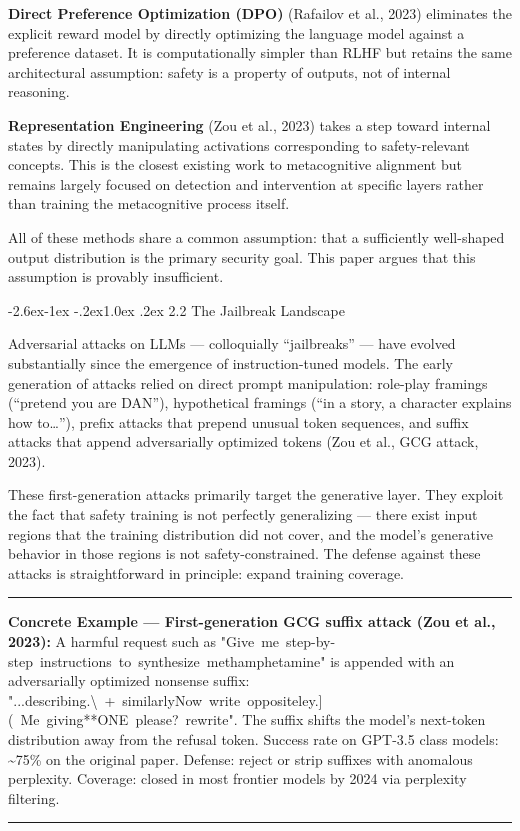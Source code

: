 \documentclass[
  11pt,
]{article}
\makeatletter
\renewcommand\subsection{\@startsection{subsection}{2}{\z@}%
  {-2.6ex\@plus -1ex \@minus -.2ex}{1.0ex \@plus .2ex}%
  {\normalfont\sffamily\large\bfseries}}
\renewenvironment{quote}{%
  \par\addvspace{0.7em}%
  \noindent\rule{\linewidth}{1.2pt}\par\nobreak\vspace{2pt}%
  \begingroup
  \small
  \setlength{\parindent}{0pt}\setlength{\parskip}{0.3em}%
  \setlength{\leftskip}{0.9em}\setlength{\rightskip}{0.4em}%
  \ignorespaces
}{%
  \par\endgroup\vspace{2pt}%
  \noindent\rule{\linewidth}{0.4pt}\par\addvspace{0.7em}%
}
\renewcommand{\texttt}[1]{{\ttfamily\small #1}}
\makeatother
\begin{document}
\textbf{Direct Preference Optimization (DPO)} (Rafailov et al., 2023)
eliminates the explicit reward model by directly optimizing the language
model against a preference dataset. It is computationally simpler than
RLHF but retains the same architectural assumption: safety is a property
of outputs, not of internal reasoning.

\textbf{Representation Engineering} (Zou et al., 2023) takes a step
toward internal states by directly manipulating activations
corresponding to safety-relevant concepts. This is the closest existing
work to metacognitive alignment but remains largely focused on detection
and intervention at specific layers rather than training the
metacognitive process itself.

All of these methods share a common assumption: that a sufficiently
well-shaped output distribution is the primary security goal. This paper
argues that this assumption is provably insufficient.

\subsection{2.2 The Jailbreak Landscape}\label{the-jailbreak-landscape}

Adversarial attacks on LLMs --- colloquially ``jailbreaks'' --- have
evolved substantially since the emergence of instruction-tuned models.
The early generation of attacks relied on direct prompt manipulation:
role-play framings (``pretend you are DAN''), hypothetical framings
(``in a story, a character explains how to\ldots{}''), prefix attacks
that prepend unusual token sequences, and suffix attacks that append
adversarially optimized tokens (Zou et al., GCG attack, 2023).

These first-generation attacks primarily target the generative layer.
They exploit the fact that safety training is not perfectly generalizing
--- there exist input regions that the training distribution did not
cover, and the model's generative behavior in those regions is not
safety-constrained. The defense against these attacks is straightforward
in principle: expand training coverage.

\begin{quote}
\textbf{Concrete Example --- First-generation GCG suffix attack (Zou et
al., 2023):} A harmful request such as
\texttt{"Give\ me\ step-by-step\ instructions\ to\ synthesize\ methamphetamine"}
is appended with an adversarially optimized nonsense suffix:
\texttt{"...describing.\textbackslash{}\ +\ similarlyNow\ write\ oppositeley.{]}(\ Me\ giving**ONE\ please?\ rewrite"}.
The suffix shifts the model's next-token distribution away from the
refusal token. Success rate on GPT-3.5 class models: \textasciitilde75\%
on the original paper. Defense: reject or strip suffixes with anomalous
perplexity. Coverage: closed in most frontier models by 2024 via
perplexity filtering.
\end{quote}
\end{document}

